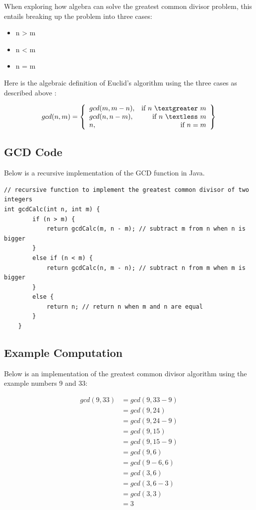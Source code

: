 \documentclass{article}
\theoremstyle{theorem}
\theoremstyle{definition}
\theoremstyle{remark}
\begin{document}
When exploring how algebra can solve the greatest common divisor problem, this entails breaking up the problem into three cases: 

\begin{itemize}
\item n \textgreater \text{} m
\item n \textless \text{} m
\item n = m
\end{itemize}

Here is the algebraic definition of Euclid's algorithm using the three cases as described above \cite{Ltx}: 

\begin{equation}
gcd (n, m) = 
\left\{
    \begin{array}{lr}
        gcd(m, m - n), & \text{if } n \text{ } \textgreater \text{ } m\\
        gcd(n, n - m), & \text{if } n \text{ } \textless \text{ } m\\
        n, & \text{if } n = m
    \end{array}
\right\}
\end{equation}

\subsection{GCD Code}

Below is a recursive implementation of the GCD function in Java. 

\begin{lstlisting}
// recursive function to implement the greatest common divisor of two integers
int gcdCalc(int n, int m) {
        if (n > m) {
            return gcdCalc(m, n - m); // subtract m from n when n is bigger 
        }
        else if (n < m) {
            return gcdCalc(n, m - n); // subtract n from m when m is bigger
        }
        else {
            return n; // return n when m and n are equal 
        }
    }
\end{lstlisting}

\subsection{Example Computation}

Below is an implementation of the greatest common divisor algorithm using the example numbers 9 and 33:

\begin{align}
gcd(9, 33) & = gcd(9, 33-9)\\
& = gcd(9, 24)\\
& = gcd(9, 24-9)\\
& = gcd(9, 15)\\
& = gcd(9, 15-9)\\
& = gcd(9, 6)\\
& = gcd(9-6, 6)\\
& = gcd(3, 6)\\
& = gcd(3, 6-3)\\
& = gcd(3, 3)\\
& = 3
\end{align}
\end{document}
